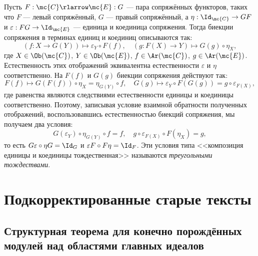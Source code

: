 \documentclass[
	extrafontsizes,
	11pt,
	hyphens,
]{memoir}
\begin{document}
Пусть \(F : \mc{C} \rlarrow \mc{E} : G\) --- пара сопряжённых функторов, таких что \(F\) --- левый сопряжённый, \(G\) --- правый сопряжённый, а \(\eta : \Id_{\mc{C}} \to GF\) и \(\varepsilon : FG \to \Id_{\mc{E}}\) --- единица и коединица сопряжения.
Тогда биекции сопряжения в терминах единиц и коединиц описываются так:
\begin{equation*}
(f : X \to G(Y)) \mapsto \varepsilon_Y \circ F(f),
\quad
(g : F(X) \to Y) \mapsto G(g) \circ \eta_X, 
\end{equation*}
где \(X \in \Ob(\mc{C})\), \(Y \in \Ob(\mc{E})\), \(f \in \Ar(\mc{C})\), \(g \in \Ar(\mc{E})\).
Естественность этих отображений эквивалентна естественности \(\varepsilon\) и \(\eta\) соответственно.
На \(F(f)\) и \(G(g)\) биекции сопряжения действуют так:
\begin{equation*}
F(f) \mapsto G(F(f)) \circ \eta_X = \eta_{G(Y)} \circ f,
\quad
G(g) \mapsto \varepsilon_Y \circ F(G(g)) = g \circ \varepsilon_{F(X)},
\end{equation*}
где равенства являются следствиями естественности единицы и коединицы соответственно.
Поэтому, записывая условие взаимной обратности полученных отображений, воспользовавшись естественностью биекций сопряжения, мы получаем два условия:
\begin{equation*}
G(\varepsilon_Y) \circ \eta_{G(Y)} \circ f = f,
\quad
g \circ \varepsilon_{F(X)} \circ F(\eta_X) = g,
\end{equation*}
то есть \(G \varepsilon \circ \eta G = \Id_G\) и \(\varepsilon F \circ F \eta = \Id_F\).
Эти условия типа <<композиция единицы и коединицы тождественная>> называются \emph{треугольными тождествами}.



\chapter{Подкорректированные старые тексты}


\section[Структурная теорема для конечно порождённых модулей над областями главных идеалов][Структурная теорема для кон.\ пор.\ модулей над ОГИ]{Структурная теорема для конечно порождённых модулей над областями главных идеалов}
\end{document}
